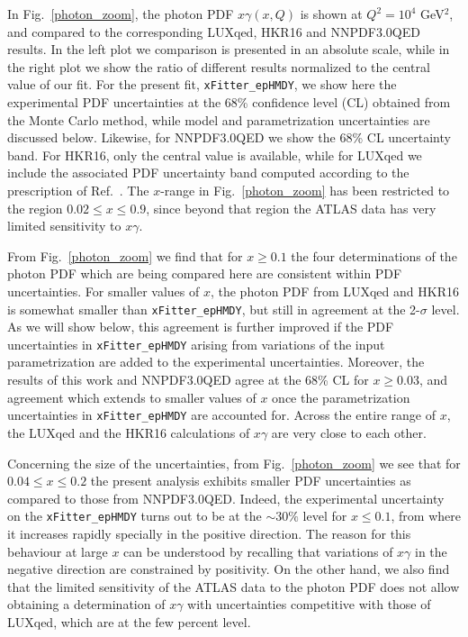 In Fig.~\ref{photon_zoom}, the photon PDF $x\gamma(x,Q)$ is shown at
$Q^2=10^4$ GeV$^2$,  and compared to the corresponding LUXqed,
HKR16 and NNPDF3.0QED results.
%
In the left plot we comparison is presented in an absolute scale, while
in the right plot we show the ratio of
different results normalized to
the central value of our fit.
%
For the present fit, {\tt xFitter\_epHMDY}, we show here
the experimental PDF uncertainties at the 68\% confidence level (CL) obtained from the Monte Carlo method,
 while model and parametrization uncertainties are discussed below.
Likewise, for NNPDF3.0QED we show the 68\% CL uncertainty band.
For HKR16, only the central value is available, while for LUXqed we include
the associated PDF uncertainty band computed according to the
prescription of Ref.~\cite{Manohar:2016nzj}.
%
The $x$-range in Fig.~\ref{photon_zoom} has been restricted to the region
$0.02 \le x \le 0.9$, since beyond that region the ATLAS
data has very limited sensitivity to $x\gamma$.

From Fig.~\ref{photon_zoom} we find that for $x\ge 0.1$ the four determinations of
the photon PDF which are being compared here are consistent within PDF uncertainties.
%
For smaller values of $x$, the photon PDF from LUXqed and HKR16 is somewhat smaller than {\tt xFitter\_epHMDY},
but still in agreement at the 2-$\sigma$ level.
%
As we will show below, this agreement is further improved if the PDF uncertainties in
{\tt xFitter\_epHMDY}
arising from variations of the input parametrization are added to the experimental
uncertainties.
%
Moreover, the results of this work and NNPDF3.0QED agree at the 68\% CL for $x\ge 0.03$,
and agreement which extends to smaller values of $x$ once the parametrization
uncertainties in {\tt xFitter\_epHMDY} are accounted for.
%
Across the entire range of $x$, the LUXqed and the HKR16 calculations of $x\gamma$ are very close
to each other.

Concerning the size of the uncertainties, from Fig.~\ref{photon_zoom} we see that
for $0.04 \le x \le 0.2$ the present analysis  exhibits smaller PDF
uncertainties as compared to those from  NNPDF3.0QED.
%
Indeed, the experimental uncertainty on the {\tt xFitter\_epHMDY}
turns out to be at the  $\sim 30\%$ level for $x\le 0.1$, from where it increases
rapidly specially in the positive direction.
%
The reason for this behaviour at large $x$ can be understood by recalling that
variations of $x\gamma$ in the negative
direction are constrained by positivity.
%
On the other hand, we also find that the limited sensitivity of the ATLAS data to the photon
PDF does not allow obtaining a determination of $x\gamma$ with uncertainties
competitive with those of LUXqed, which are at the few percent level.


